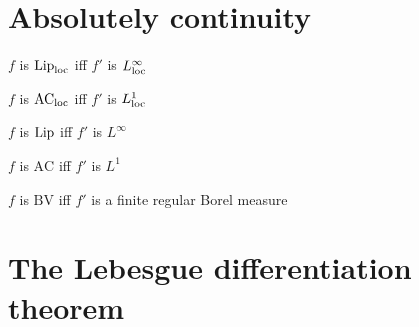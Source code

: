 \documentclass{../note}
\begin{document}
\chapter{Absolutely continuity}

\begin{parts}
\item $f$ is $\operatorname{Lip}_{\mathrm{loc}}$ iff $f'$ is $L_{\mathrm{loc}}^\infty$
\item $f$ is $\textrm{AC}_{\mathrm{loc}}$ iff $f'$ is $L_{\mathrm{loc}}^1$
\end{parts}
\begin{parts}
\item $f$ is $\operatorname{Lip}$ iff $f'$ is $L^\infty$
\item $f$ is $\textrm{AC}$ iff $f'$ is $L^1$
\item $f$ is $\textrm{BV}$ iff $f'$ is a finite regular Borel measure
\end{parts}



\chapter{The Lebesgue differentiation theorem}
\end{document}
